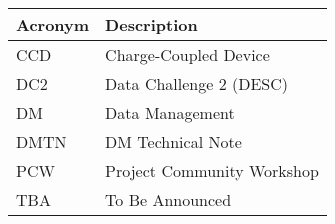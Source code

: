 \addtocounter{table}{-1}
\begin{longtable}{p{}p{}}\hline
\textbf{Acronym} & \textbf{Description}  \\\hline

CCD & Charge-Coupled Device \\\hline
DC2 & Data Challenge 2 (DESC) \\\hline
DM & Data Management \\\hline
DMTN & DM Technical Note \\\hline
PCW & Project Community Workshop \\\hline
TBA & To Be Announced \\\hline
\end{longtable}
